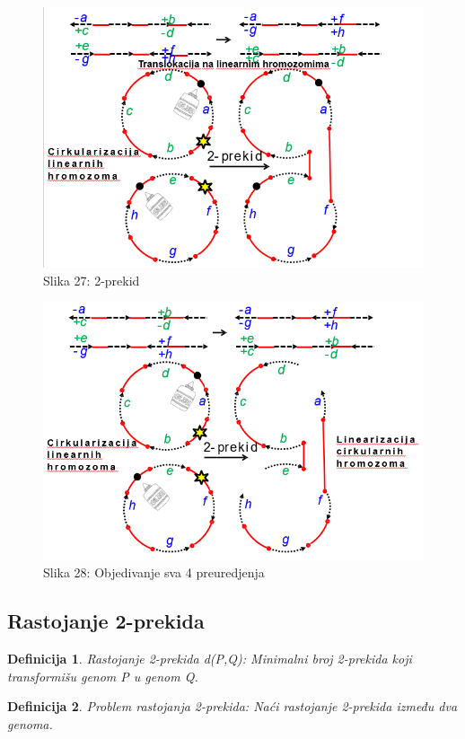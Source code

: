 \documentclass{article}
\newtheorem{definicija}{Definicija}
\begin{document}
\begin{figure}[h]
\centering
\includegraphics[scale=0.6]{slike/2_prekid_1.PNG}
\caption{Slika 27: 2-prekid}
\label{slika:X}
\end{figure}

\newpage
\begin{figure}[h]
\centering
\includegraphics[scale=0.6]{slike/2_prekid_2.PNG}
\caption{Slika 28: Objedivanje sva 4 preuredjenja}
\label{slika:X}
\end{figure}

\subsection{Rastojanje 2-prekida}

\begin{definicija} {Rastojanje 2-prekida d(P,Q): Minimalni broj 2-prekida koji transformišu genom P u genom Q.}
\end{definicija}
\begin{definicija} {Problem rastojanja 2-prekida: Naći rastojanje 2-prekida između dva genoma.}
\end{definicija}
\end{document}
